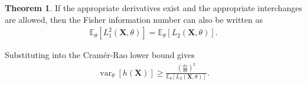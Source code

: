 \documentclass[a4paper,12pt]{article}
\theoremstyle{definition}
\newtheorem{theorem}{Theorem}[section]
\theoremstyle{definition}
\theoremstyle{definition}
\newcommand{\bs}{\boldsymbol}
\newcommand{\var}{\operatorname{var}}
\begin{document}
    \begin{theorem}
        If the appropriate derivatives exist and the appropriate interchanges are allowed, then the Fisher information number can also be written as
        \begin{align*}
            \mathbb{E}_\theta \left[ L_1^2(\bs{X}, \theta) \right] = \mathbb{E}_\theta \left[ L_2(\bs{X}, \theta) \right].
        \end{align*}
    \end{theorem}
    Substituting into the Cram\'er-Rao lower bound gives
    \begin{align*}
        \var_\theta[h(\bs{X})] \geq \frac{\left( \frac{d\lambda}{d\theta} \right)^2}{\mathbb{E}_\theta \left[ L_2(\bs{X}, \theta) \right]}.
    \end{align*}
\end{document}
